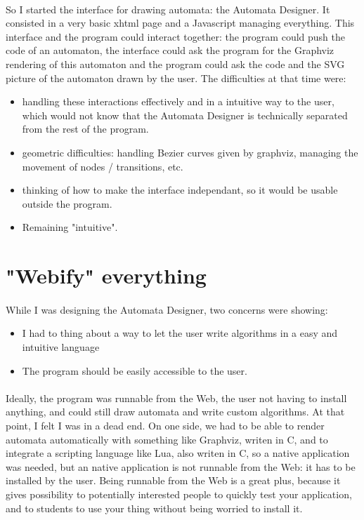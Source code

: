 \documentclass{article}
\begin{document}
\begin{sloppypar}
   
\paragraph{}
So I started the interface for drawing automata: the Automata Designer. It consisted in a very basic xhtml page and a Javascript managing everything. This interface and the program could interact together: the program could push the code of an automaton, the interface could ask the program for the Graphviz rendering of this automaton and the program could ask the code and the SVG picture of the automaton drawn by the user. The difficulties at that time were:
    
\begin{itemize}
	\item{ handling these interactions effectively and in a intuitive way to the user, which would not know that the Automata Designer is technically separated from the rest of the program.}
	\item{ geometric difficulties: handling Bezier curves given by graphviz, managing the movement of nodes / transitions, etc.}
	\item{ thinking of how to make the interface independant, so it would be usable outside the program.}
	\item{ Remaining "intuitive".}
\end{itemize}




\section{ "Webify" everything}


\paragraph{}
While I was designing the Automata Designer, two concerns were showing:
    
\begin{itemize}
	\item{ I had to thing about a way to let the user write algorithms in a easy and intuitive language}
	\item{ The program should be easily accessible to the user.}
\end{itemize}

\paragraph{}
Ideally, the program was runnable from the Web, the user not having to install anything, and could still draw automata and write custom algorithms. At that point, I felt I was in a dead end. On one side, we had to be able to render automata automatically with something like Graphviz, writen in C, and to integrate a scripting language like Lua, also writen in C, so a native application was needed, but an native application is not runnable from the Web: it has to be installed by the user. Being runnable from the Web is a great plus, because it gives possibility to potentially interested people to quickly test your application, and to students to use your thing without being worried to install it.


\end{sloppypar}
\end{document}
